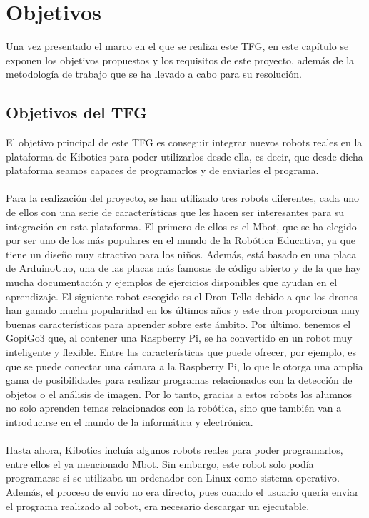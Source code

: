 \documentclass{report}
\begin{document}
\chapter{Objetivos}

Una vez presentado el marco en el que se realiza este TFG, en este capítulo se exponen los objetivos propuestos y los requisitos de este proyecto, además de la metodología de trabajo que se ha llevado a cabo para su resolución.
\section{Objetivos del TFG}

El objetivo principal de este TFG es conseguir integrar nuevos robots reales en la plataforma de Kibotics para poder utilizarlos desde ella, es decir, que desde dicha plataforma seamos capaces de programarlos y de enviarles el programa.
\\
\\
Para la realización del proyecto, se han utilizado tres robots diferentes, cada uno de ellos con una serie de características que les hacen ser interesantes para su integración en esta plataforma. El primero de ellos es el Mbot, que se ha elegido por ser uno de los más populares en el mundo de la Robótica Educativa, ya que tiene un diseño muy atractivo para los niños. Además, está basado en una placa de ArduinoUno, una de las placas más famosas de código abierto y de la que hay mucha documentación y ejemplos de ejercicios disponibles que ayudan en el aprendizaje. El siguiente robot escogido es el Dron Tello debido a que los drones han ganado mucha popularidad en los últimos años y este dron proporciona muy buenas características para aprender sobre este ámbito. Por último, tenemos el GopiGo3 que, al contener una Raspberry Pi, se ha convertido en un robot muy inteligente y flexible. Entre las características que puede ofrecer, por ejemplo, es que se puede conectar una cámara a la Raspberry Pi, lo que le otorga una amplia gama de posibilidades para realizar programas relacionados con la detección de objetos o el análisis de imagen. Por lo tanto, gracias a estos robots los alumnos no solo aprenden temas relacionados con la robótica, sino que también van a introducirse en el mundo de la informática y electrónica.
\\
\\
Hasta ahora, Kibotics incluía algunos robots reales para poder programarlos, entre ellos el ya mencionado Mbot. Sin embargo, este robot solo podía programarse si se utilizaba un ordenador con Linux como sistema operativo. Además, el proceso de envío no era directo, pues cuando el usuario quería enviar el programa realizado al robot, era necesario descargar un ejecutable.
\end{document}
